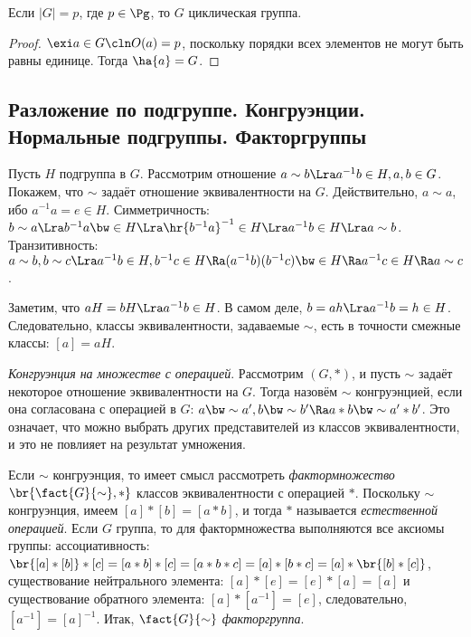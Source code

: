 \documentclass[a4paper]{article}
\begin{document}
\begin{imp}
Если $|G|=p$, где $p \in \Pg$, то $G$ циклическая группа.
\end{imp}
\begin{proof}
$\exi a \in G\cln O(a)=p$, поскольку порядки всех элементов не могут быть равны единице. Тогда $\ha{a}=G$.
\end{proof}

\subsection{Разложение по подгруппе. Конгруэнции. Нормальные подгруппы. Факторгруппы}

Пусть $H$ подгруппа в $G$. Рассмотрим отношение $a \sim b \Lra a^{-1}b \in H, a, b \in G$.  Покажем, что
$\sim$ задаёт отношение эквивалентности на $G$. Действительно, $a \sim a$, ибо $a^{-1}a = e \in H$.
Симметричность: $b \sim a \Lra b^{-1}a \bw\in H \Lra \hr{b^{-1}a}^{-1} \in H \Lra a^{-1}b \in H \Lra a \sim b$.
Транзитивность: $a \sim b, b \sim c \Lra a^{-1}b \in H, b^{-1}c \in H \Ra (a^{-1}b)(b^{-1}c) \bw\in H \Ra
a^{-1}c \in H \Ra a \sim c$.

Заметим, что $aH=bH \Lra a^{-1}b \in H$. В самом деле, $b=ah \Lra a^{-1}b=h\in H$.  Следовательно, классы
эквивалентности, задаваемые $\sim$, есть в точности смежные классы: $[a]=aH$.

\begin{df}
\emph{Конгруэнция на множестве с операцией}. Рассмотрим $(G, *)$, и пусть $\sim$  задаёт некоторое отношение
эквивалентности на $G$. Тогда назовём $\sim$ конгруэнцией, если она согласована с операцией в $G$:
$a \bw\sim a', b \bw\sim b' \Ra a*b \bw\sim a'* b'$. Это означает, что можно выбрать других представителей из классов
эквивалентности, и это не повлияет на результат умножения.
\end{df}

\begin{df}
Если $\sim$ конгруэнция, то имеет смысл рассмотреть \emph{фактормножество} $\br{\fact{G}{\sim}, *}$ классов
эквивалентности с операцией $*$. Поскольку $\sim$ конгруэнция, имеем  $[a]*[b]=[a*b]$, и тогда $*$
называется \emph{естественной операцией}. Если $G$ группа, то для фактормножества выполняются все аксиомы
группы: ассоциативность: $\br{[a]*[b]}*[c]=[a*b]*[c]=[a*b*c]=[a]*[b*c]=[a]*\br{[b]*[c]}$, существование
нейтрального элемента: $[a]*[e]=[e]*[a]=[a]$ и существование обратного элемента: $[a]*[a^{-1}]=[e]$,
следовательно, $[a^{-1}]=[a]^{-1}$. Итак, $\fact{G}{\sim}$ \emph{факторгруппа}.
\end{df}
\end{document}
